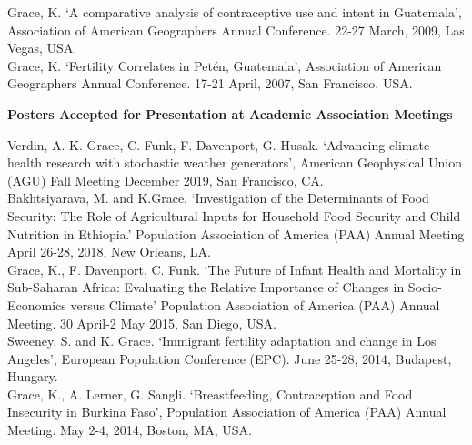 \documentclass[11pt]{article} %
\begin{document}
\noindent
Grace, K. `A comparative analysis of contraceptive use and intent in Guatemala',
Association of American Geographers Annual Conference. 22-27 March, 2009, Las Vegas, USA.\\


\noindent
Grace, K.  `Fertility Correlates in Pet\'en, Guatemala',
Association of American Geographers Annual Conference. 17-21 April, 2007, San Francisco, USA.\\

\vspace{.5cm}

\noindent
 \textbf {Posters Accepted for Presentation at Academic Association Meetings }
 
 \noindent
Verdin, A. K. Grace, C. Funk, F. Davenport, G. Husak. `Advancing climate-health research with stochastic weather generators', American Geophysical Union (AGU)
 Fall Meeting December 2019, San Francisco, CA.\\

\noindent
Bakhtsiyarava, M. and K.Grace. `Investigation of the Determinants of Food Security: The Role of Agricultural Inputs for Household Food Security and Child Nutrition in Ethiopia.' Population Association of America (PAA) Annual Meeting April 26-28, 2018, New Orleans, LA.\\

\noindent
Grace, K., F. Davenport, C. Funk. `The Future of Infant Health and Mortality in Sub-Saharan Africa: Evaluating the Relative Importance of Changes in Socio-Economics versus Climate' Population 
Association of America (PAA) Annual Meeting. 30 April-2 May 2015, San Diego, USA. \\

\noindent
Sweeney, S. and K. Grace. `Immigrant fertility adaptation and change in Los Angeles', European Population Conference (EPC). June 25-28, 2014, Budapest, Hungary.\\

\noindent
Grace, K.,  A. Lerner, G. Sangli. `Breastfeeding, Contraception and Food Insecurity in Burkina Faso', Population Association of America (PAA) Annual Meeting.  May 2-4, 2014, Boston, MA, USA. \\
\end{document}
